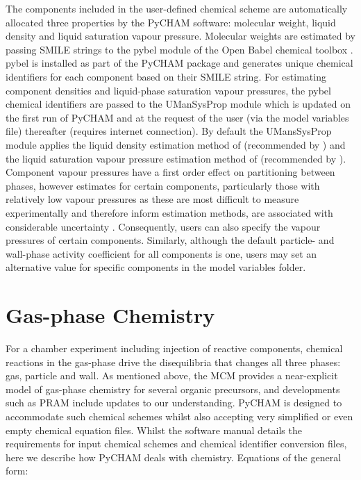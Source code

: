 \documentclass[gmd, manuscript]{copernicus}
\begin{document}
The components included in the user-defined chemical scheme are automatically allocated three properties by the PyCHAM software: molecular weight, liquid density and liquid saturation vapour pressure.  Molecular weights are  estimated by passing SMILE strings to the pybel module of the Open Babel chemical toolbox \citep{OBoyle2011}.  pybel is installed as part of the PyCHAM package and generates unique chemical identifiers for each component based on their SMILE string.  For estimating component densities and liquid-phase saturation vapour pressures, the pybel chemical identifiers are passed to the UManSysProp module \citep{Topping2016} which is updated on the first run of PyCHAM and at the request of the user (via the model variables file) thereafter (requires internet connection).  By default the UMansSysProp module applies the liquid density estimation method of \citet{Girolami1994} (recommended by \citet{Barley2013}) and the liquid saturation vapour pressure estimation method of \citet{Nannoolal2008} (recommended by \citet{OMeara2014}).  Component vapour pressures have a first order effect on partitioning between phases, however estimates for certain components, particularly those with relatively low vapour pressures as these are most difficult to measure experimentally and therefore inform estimation methods,  are associated with considerable uncertainty \citep{OMeara2014}.  Consequently, users can also specify the vapour pressures of certain components.  Similarly, although the default particle- and wall-phase activity coefficient for all components is one, users may set an alternative value for specific components in the model variables folder.

\section{Gas-phase Chemistry}\label{sec:photochem}

For a chamber experiment including injection of reactive components, chemical reactions in the gas-phase drive the disequilibria that changes all three phases: gas, particle and wall.  As mentioned above, the MCM provides a near-explicit model of gas-phase chemistry for several organic precursors, and developments such as PRAM include updates to our understanding.  PyCHAM is designed to accommodate such chemical schemes whilst also accepting very simplified or even empty chemical equation files.  Whilst the software manual details the requirements for input chemical schemes and chemical identifier conversion files, here we describe how PyCHAM deals with chemistry.  Equations of the general form:
\end{document}
